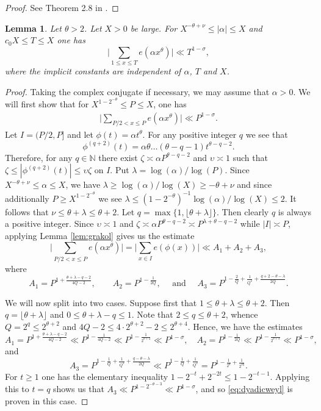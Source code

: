 \documentclass[11pt,reqno]{amsart}
\numberwithin{equation}{section}
\newtheorem{lemma}{Lemma}[section]
\begin{document}
\begin{proof} See Theorem 2.8 in \cite{GraKol}. 
\end{proof}

\begin{lemma} \label{lem:weyl}
Let $\theta > 2$. Let $X > 0$ be large. For $X^{-\theta+\nu} \leq |\alpha| \leq X$ and $c_0X \leq T \leq X$ one has 
\[ \Big|\sum_{1 \leq x \leq T} e(\alpha x^{\theta}) \Big| \ll T^{1-\sigma}, \]
where the implicit constants are independent of $\alpha$, $T$ and $X$. 
\end{lemma}

\begin{proof} Taking the complex conjugate if necessary, we may assume that $\alpha > 0$. We will first show that for $X^{1-2^{-\theta}} \leq P \leq X$, one has 
\begin{align} \label{eq:dyadicweyl}
\Big| \sum_{P/2 < x \leq P} e(\alpha x^{\theta}) \Big| \ll P^{1-\sigma}. 
\end{align}
Let $I = (P/2,P]$ and let $\phi(t) = \alpha t^{\theta}$. For any positive integer $q$ we see that 
\[ \phi^{(q+2)}(t) = \alpha \theta\dots(\theta-q-1)t^{\theta-q-2}. \]
Therefore, for any $q \in \mathbb{N}$ there exist $\zeta \asymp \alpha P^{\theta-q-2}$ and $\upsilon \asymp 1$ such that $\zeta \leq |\phi^{(q+2)}(t)| \leq \upsilon\zeta$ on $I$. Put $\lambda = \log(\alpha)/\log(P)$. Since $X^{-\theta+\nu} \leq \alpha \leq X$, we have $\lambda \geq \log(\alpha)/\log(X) \geq -\theta+\nu$ and since additionally $P \geq X^{1-2^{-\theta}}$ we see $\lambda \leq (1-2^{-\theta})^{-1}\log(\alpha)/\log(X) \leq 2$. It follows that $\nu \leq \theta + \lambda \leq \theta+2$. Let $q = \max\{1, \lfloor \theta+\lambda\rfloor\}$. Then clearly $q$ is always a positive integer. Since $\upsilon \asymp 1$ and $\zeta \asymp \alpha P^{\theta-q-2} \asymp P^{\lambda+\theta-q-2}$ while $|I| \asymp P$, applying Lemma \ref{lem:grakol} gives us the estimate 
\[ \Big|\sum_{P/2 < x \leq P} e(\alpha x^{\theta}) \Big| = \big| \sum_{x \in I} e(\phi(x)) \big| \ll A_1+A_2+A_3, \]
where 
\[ A_1 = P^{1+\frac{\theta+\lambda-q-2}{4Q-2}}, \quad \quad A_2 = P^{1-\frac{1}{2Q}}, \quad \text{ and } \quad A_3 = P^{1-\frac{2}{Q}+\frac{1}{Q^2}+\frac{q+2-\theta-\lambda}{2Q}}. \]

We will now split into two cases. Suppose first that $1 \leq \theta+\lambda \leq \theta+2$. Then $q = \lfloor \theta+\lambda\rfloor$ and $0 \leq \theta+\lambda-q \leq 1$. Note that $2 \leq q \leq \theta+2$, whence $Q = 2^q \leq 2^{\theta+2}$ and $4Q-2 \leq 4\cdot 2^{\theta+2}-2 \leq 2^{\theta+4}$. Hence, we have the estimates 
\[ A_1 = P^{1+\frac{\theta+\lambda-q-2}{4Q-2}} \ll P^{1-\frac{1}{4Q-2}} \ll P^{1-\frac{1}{2^{\theta+4}}} \ll P^{1-\sigma}, \quad A_2 = P^{1-\frac{1}{2Q}} \ll P^{1-\frac{1}{2^{\theta+3}}} \ll P^{1-\sigma}, \]
and  
\[ A_3 = P^{1-\frac{1}{Q}+\frac{1}{Q^2}+\frac{q-\theta-\lambda}{2Q}} \ll P^{1-\frac{1}{Q}+\frac{1}{Q^2}} = P^{1-\frac{1}{2^q}+\frac{1}{2^{2q}}}. \]
For $t \geq 1$ one has the elementary inequality $1-2^{-t}+2^{-2t} \leq 1-2^{-t-1}$. Applying this to $t = q$ shows us that $A_3 \ll P^{1-2^{-\theta-3}} \ll P^{1-\sigma}$, and so \eqref{eq:dyadicweyl} is proven in this case. 


\end{proof}
\end{document}

